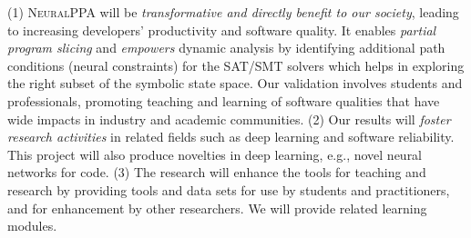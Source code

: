 \documentclass[11pt]{article}
\newcommand{\tool}{\textsc{NeuralPPA}\xspace}
\begin{document}
(1) {\tool} will be {\em transformative and directly benefit to our
  society}, leading to increasing developers’ productivity and
software quality.
It enables \textit{partial program slicing} and \emph{empowers}
dynamic analysis by identifying additional path conditions (neural
constraints) for the SAT/SMT solvers which helps in exploring the
right subset of the symbolic state space.
%
Our validation involves students and professionals, promoting teaching
and learning of software qualities that have wide impacts in industry
and academic communities. (2) Our results will {\em foster research
  activities} in related fields such as deep learning and software
reliability. This project will also produce novelties in deep learning,
e.g., novel neural networks for code. (3) The research will enhance
the tools for teaching and research by providing tools and
data sets for use by students and practitioners, and for enhancement
by other researchers. We will provide related learning modules.






\end{document}
